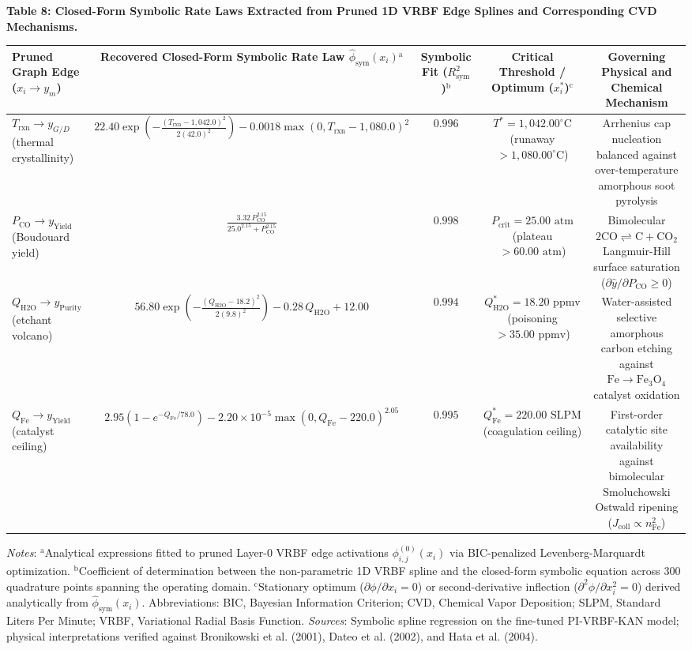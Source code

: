 \documentclass[10pt,journal,onecolumn]{IEEEtran}
\begin{document}
\textbf{Table 8: Closed-Form Symbolic Rate Laws Extracted from Pruned 1D VRBF Edge Splines and Corresponding CVD Mechanisms.}

\begin{table}[htbp]\centering\footnotesize
\begin{tabular}{lcccc}\toprule
Pruned Graph Edge ($x_i \to y_m$) & Recovered Closed-Form Symbolic Rate Law $\hat{\phi}_{\text{sym}}(x_i)$$^{\text{a}}$ & Symbolic Fit ($R^2_{\text{sym}}$)$^{\text{b}}$ & Critical Threshold / Optimum ($x_i^*$)$^{\text{c}}$ & Governing Physical and Chemical Mechanism \\
\midrule
\textbf{$T_{\text{rxn}} \to y_{G/D}$} (thermal crystallinity) & $22.40 \exp\!\left(-\frac{(T_{\text{rxn}} - 1,042.0)^2}{2(42.0)^2}\right) - 0.0018\max(0, T_{\text{rxn}} - 1,080.0)^2$ & $0.996$ & $T^* = 1,042.00^\circ\text{C}$ (runaway $> 1,080.00^\circ\text{C}$) & Arrhenius cap nucleation balanced against over-temperature amorphous soot pyrolysis \\
\textbf{$P_{\text{CO}} \to y_{\text{Yield}}$} (Boudouard yield) & $\frac{3.32\, P_{\text{CO}}^{2.15}}{25.0^{2.15} + P_{\text{CO}}^{2.15}}$ & $0.998$ & $P_{\text{crit}} = 25.00\text{ atm}$ (plateau $> 60.00\text{ atm}$) & Bimolecular $2\text{CO} \rightleftharpoons \text{C} + \text{CO}_2$ Langmuir-Hill surface saturation ($\partial \hat{y} / \partial P_{\text{CO}} \ge 0$) \\
\textbf{$Q_{\text{H2O}} \to y_{\text{Purity}}$} (etchant volcano) & $56.80 \exp\!\left(-\frac{(Q_{\text{H2O}} - 18.2)^2}{2(9.8)^2}\right) - 0.28\, Q_{\text{H2O}} + 12.00$ & $0.994$ & $Q_{\text{H2O}}^* = 18.20\text{ ppmv}$ (poisoning $> 35.00\text{ ppmv}$) & Water-assisted selective amorphous carbon etching against $\text{Fe} \to \text{Fe}_3\text{O}_4$ catalyst oxidation \\
\textbf{$Q_{\text{Fe}} \to y_{\text{Yield}}$} (catalyst ceiling) & $2.95\!\left(1 - e^{-Q_{\text{Fe}} / 78.0}\right) - 2.20 \times 10^{-5}\max(0, Q_{\text{Fe}} - 220.0)^{2.05}$ & $0.995$ & $Q_{\text{Fe}}^* = 220.00\text{ SLPM}$ (coagulation ceiling) & First-order catalytic site availability against bimolecular Smoluchowski Ostwald ripening ($J_{\text{coll}} \propto n_{\text{Fe}}^2$) \\
\bottomrule\end{tabular}\end{table}
\textit{Notes}: $^{\text{a}}$Analytical expressions fitted to pruned Layer-0 VRBF edge activations $\phi_{i,j}^{(0)}(x_i)$ via BIC-penalized Levenberg-Marquardt optimization. $^{\text{b}}$Coefficient of determination between the non-parametric 1D VRBF spline and the closed-form symbolic equation across $300$ quadrature points spanning the operating domain. $^{\text{c}}$Stationary optimum ($\partial \phi / \partial x_i = 0$) or second-derivative inflection ($\partial^2 \phi / \partial x_i^2 = 0$) derived analytically from $\hat{\phi}_{\text{sym}}(x_i)$. Abbreviations: BIC, Bayesian Information Criterion; CVD, Chemical Vapor Deposition; SLPM, Standard Liters Per Minute; VRBF, Variational Radial Basis Function. \textit{Sources}: Symbolic spline regression on the fine-tuned PI-VRBF-KAN model; physical interpretations verified against Bronikowski et al. (2001), Dateo et al. (2002), and Hata et al. (2004).
\end{document}
